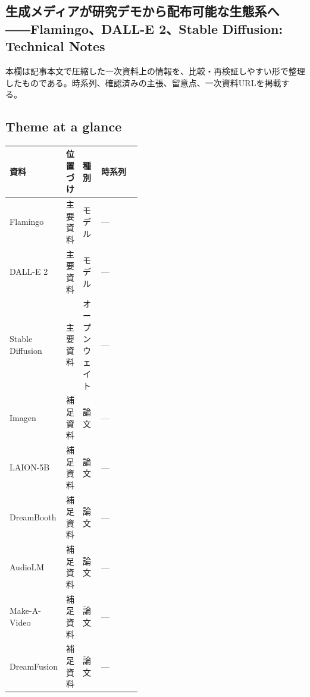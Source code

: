 \subsection*{生成メディアが研究デモから配布可能な生態系へ――Flamingo、DALL-E 2、Stable Diffusion: Technical Notes}
本欄は記事本文で圧縮した一次資料上の情報を、比較・再検証しやすい形で整理したものである。時系列、確認済みの主張、留意点、一次資料URLを掲載する。
\medskip
\subsection*{Theme at a glance}
\begin{center}
\footnotesize
\begin{tabularx}{\linewidth}{@{}p{0.20\linewidth}p{0.10\linewidth}p{0.14\linewidth}X@{}}
\toprule
資料 & 位置づけ & 種別 & 時系列 \\
\midrule
Flamingo & 主要資料 & モデル & — \\
DALL-E 2 & 主要資料 & モデル & — \\
Stable Diffusion & 主要資料 & オープンウェイト & — \\
Imagen & 補足資料 & 論文 & — \\
LAION-5B & 補足資料 & 論文 & — \\
DreamBooth & 補足資料 & 論文 & — \\
AudioLM & 補足資料 & 論文 & — \\
Make-A-Video & 補足資料 & 論文 & — \\
DreamFusion & 補足資料 & 論文 & — \\
\bottomrule
\end{tabularx}
\end{center}
\normalsize

